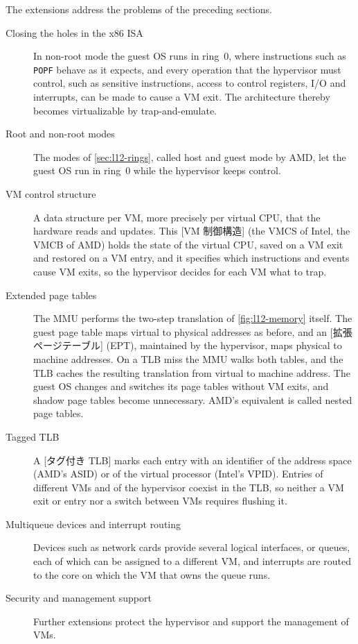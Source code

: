 \documentclass[../main.tex]{subfiles}
\begin{document}
The extensions address the problems of the preceding sections.
\begin{description}
  \item[Closing the holes in the x86 ISA] In non-root mode the guest OS
    runs in ring~0, where instructions such as \texttt{POPF} behave as it
    expects, and every operation that the hypervisor must control, such as
    sensitive instructions, access to control registers, I/O and
    interrupts, can be made to cause a VM exit.  The architecture thereby
    becomes virtualizable by trap-and-emulate.
  \item[Root and non-root modes] The modes of \cref{sec:l12-rings}, called
    host and guest mode by AMD, let the guest OS run in ring~0 while the
    hypervisor keeps control.
  \item[VM control structure] A data structure per VM, more precisely per
    virtual CPU, that the hardware reads and updates.  This
    [VM 制御構造] (the VMCS of Intel, the VMCB
    of AMD) holds the state
    of the virtual CPU, saved on a VM exit and restored on a VM entry, and
    it specifies which instructions and events cause VM exits, so the
    hypervisor decides for each VM what to trap.
  \item[Extended page tables] The MMU performs the two-step translation of
    \cref{fig:l12-memory} itself.  The guest page table maps virtual to
    physical addresses as before, and an
    [拡張ページテーブル]
    (EPT), maintained by the
    hypervisor, maps physical to machine addresses.  On a TLB miss the MMU
    walks both tables, and the TLB caches the resulting translation from
    virtual to machine address.  The guest OS
    changes and switches its page tables without VM exits, and shadow page
    tables become unnecessary.  AMD's equivalent is called nested page tables.
  \item[Tagged TLB] A [タグ付き TLB] marks each entry with
    an identifier of the address space (AMD's ASID) or of the virtual
    processor (Intel's VPID).  Entries of different VMs and of the
    hypervisor coexist in the TLB, so neither a VM exit or entry nor a
    switch between VMs requires flushing it.
  \item[Multiqueue devices and interrupt routing] Devices such as network
    cards provide several logical interfaces, or queues, each of which can
    be assigned to a different VM, and interrupts are routed to the core on
    which the VM that owns the queue runs.
  \item[Security and management support] Further extensions protect the
    hypervisor and support the management of VMs.
\end{description}
\end{document}

